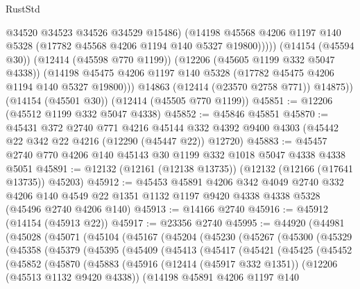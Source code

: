 \begin{lexlean}{RustStd}
\begin{coremodule}
                  @34520
                  @34523
                  @34526
                  @34529
                  @15486)
                (@14198
                  @45568
                  @4206
                  @1197
                  @140
                  @5328
                  (@17782 @45568 @4206 @1194 @140 @5327 @19800)))))
          (@14154 (@45594 @30))
          (@12414 (@45598 @770 @1199))
          (@12206 (@45605 @1199 @332 @5047 @4338))
          (@14198 @45475 @4206 @1197 @140 @5328 (@17782 @45475 @4206 @1194 @140 @5327 @19800)))
        @14863
        (@12414 (@23570 @2758 @771))
        @14875))
    (@14154 (@45501 @30))
    (@12414 (@45505 @770 @1199))
@45851 := @12206 (@45512 @1199 @332 @5047 @4338)
@45852 := @45846 @45851
@45870 := @45431
    @372
    @2740
    @771
    @4216
    @45144
    @332
    @4392
    @9400
    @4303
    (@45442 @22 @342 @22 @4216 (@12290 (@45447 @22)) @12720)
@45883 := @45457 @2740 @770 @4206 @140 @45143 @30 @1199 @332 @1018 @5047 @4338 @4338 @5051
@45891 := @12132 (@12161 (@12138 @13735)) (@12132 (@12166 (@17641 @13735)) @45203)
@45912 := @45453
    @45891
    @4206
    @342
    @4049
    @2740
    @332
    @4206
    @140
    @4549
    @22
    @1351
    @1132
    @1197
    @9420
    @4338
    @4338
    @5328
    (@45496 @2740 @4206 @140)
@45913 := @14166 @2740
@45916 := @45912 (@14154 (@45913 @22))
@45917 := @23356 @2740
@45995 := @44920
    (@44981
      (@45028
        (@45071
          (@45104
            (@45167
              (@45204
                (@45230
                  (@45267
                    (@45300
                      (@45329
                        (@45358
                          (@45379
                            (@45395
                              (@45409
                                (@45413
                                  (@45417
                                    (@45421
                                      (@45425
                                        (@45452
                                          (@45852
                                            (@45870
                                              (@45883
                                                (@45916
                                                  (@12414 (@45917 @332 @1351))
                                                  (@12206 (@45513 @1132 @9420 @4338))
                                                  (@14198
                                                    @45891
                                                    @4206
                                                    @1197
                                                    @140

\end{coremodule}
\end{lexlean}
